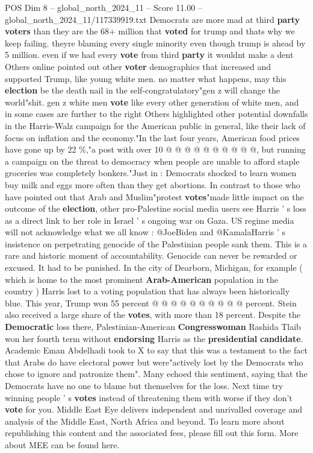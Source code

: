 \begin{textsample}{POS Dim 8 – global\_north\_2024\_11 – Score 11.00 – global\_north\_2024\_11/117339919.txt}
Democrats are more mad at third \textbf{party} \textbf{voters} than they are the 68+ million that \textbf{voted} for trump and thats why we keep failing. theyre blaming every single minority even though trump is ahead by 5 million. even if we had every \textbf{vote} from third \textbf{party} it wouldnt make a dent Others online pointed out other \textbf{voter} demographics that increased and supported Trump, like young white men. no matter what happens, may this \textbf{election} be the death nail in the self-congratulatory"gen z will change the world"shit. gen z white men \textbf{vote} like every other generation of white men, and in some cases are further to the right Others highlighted other potential downfalls in the Harris-Walz campaign for the American public in general, like their lack of focus on inflation and the economy."In the last four years, American food prices have gone up by 22 \%,"a post with over 10 @ @ @ @ @ @ @ @ @ @, but running a campaign on the threat to democracy when people are unable to afford staple groceries was completely bonkers."Just in : Democrats shocked to learn women buy milk and eggs more often than they get abortions.
In contrast to those who have pointed out that Arab and Muslim"protest \textbf{votes}"made little impact on the outcome of the \textbf{election}, other pro-Palestine social media users see Harris ' s loss as a direct link to her role in Israel ' s ongoing war on Gaza.
US regime media will not acknowledge what we all know : @JoeBiden and @KamalaHarris ' s insistence on perpetrating genocide of the Palestinian people sank them.
This is a rare and historic moment of accountability.
Genocide can never be rewarded or excused.
It had to be punished.
In the city of Dearborn, Michigan, for example ( which is home to the most prominent \textbf{Arab-American} population in the country ) Harris lost to a voting population that has always been historically blue.
This year, Trump won 55 percent @ @ @ @ @ @ @ @ @ @ percent.
Stein also received a large share of the \textbf{votes}, with more than 18 percent.
Despite the \textbf{Democratic} loss there, Palestinian-American \textbf{Congresswoman} Rashida Tlaib won her fourth term without \textbf{endorsing} Harris as the \textbf{presidential} \textbf{candidate}.
Academic Eman Abdelhadi took to X to say that this was a testament to the fact that Arabs do have electoral power but were"actively lost by the Democrats who chose to ignore and patronize them".
Many echoed this sentiment, saying that the Democrats have no one to blame but themselves for the loss.
Next time try winning people ' s \textbf{votes} instead of threatening them with worse if they don't \textbf{vote} for you.
Middle East Eye delivers independent and unrivalled coverage and analysis of the Middle East, North Africa and beyond.
To learn more about republishing this content and the associated fees, please fill out this form.
More about MEE can be found here.

\end{textsample}
